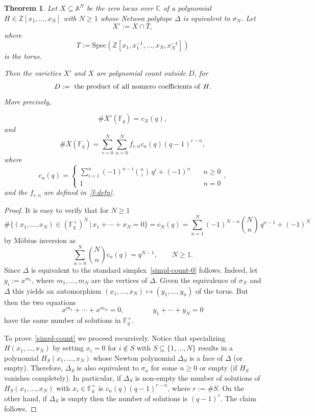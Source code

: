 \documentclass[12pt]{article}
\newcommand{\Spec}{\mbox{Spec}}
\newcommand{\Z}{{\mathbb Z}}
\newcommand{\F}{{\mathbb F}}
\newcommand{\C}{{\mathbb C}}
\newcommand{\A}{\mathbb A}
\newtheorem{theorem}{Theorem}[section]
\begin{document}
\begin{theorem}
\label{simpl-count-thm}
  Let $X\subseteq \A^N$ be the zero locus over $\C$ of a polynomial
  $H\in \Z[x_1,\ldots,x_N]$ with $N\geq 1$ whose Netwon polytope $\Delta$
  is equivalent to $\sigma_N$. Let
$$
X':=X\cap T,
$$
where 
$$
T:=\Spec(\Z[x_1,x_1^{-1},\ldots,x_N,x_N^{-1}])
$$
is the torus. 

Then the varieties $X'$ and  $X$ are polynomial count outside $D$, for
$$D:={\rm\ the \ product\ of \ all\  nonzero\  coefficients\ of\ }H.$$
More
precisely, 

\begin{equation}
\label{simpl-count-0}
\#X'(\F_q)= c_N(q), 
\end{equation}
and
\begin{equation}
\label{simpl-count}
\#X(\F_q)=\sum_{r=0}^N\sum_{n=0}^N
f_{r,n}c_n(q)(q-1)^{r-n},
\end{equation}
where
$$
c_n(q)=
\begin{cases}
\sum_{i=1}^n(-1)^{n-i}\binom{n}{i}\, q^i + (-1)^n&\quad n\geq 0\\
1 & \quad n=0
\end{cases},
$$
 and the $f_{r,n}$ are defined in~\eqref{f-defn}.
\end{theorem}
\begin{proof}
  It is easy to verify that for $N\ge 1$
$$
\#\{(x_1,\ldots,x_N)\in (\F_q^\times)^N \,|\,
x_1+\cdots
+x_N=0\}= c_N(q)=\sum_{n=1}^N(-1)^{N-n}\binom Nn\, q^{n-1} + (-1)^N
$$
by M\"obius inversion as
$$
\sum_{n=0}^N\binom N nc_n(q)=q^{N-1},\qquad N\geq 1.
$$
Since $\Delta$ is equivalent to the standard
simplex~\eqref{simpl-count-0} follows. Indeed, 
let $y_i:=x^{m_i}$, where $m_1,\ldots,m_N$ are
the vertices of $\Delta$. Given the equivalence of $\sigma_N$ and
$\Delta$ this yields an automorphism $(x_1,\ldots,x_N)\mapsto
(y_1,\ldots,y_n)$ of the torus. But then the two equations
$$
x^{m_1}+\cdots+x^{m_N}=0, \qquad \qquad y_1+\cdots+y_N=0
$$
have the same number of solutions in $\F_q^\times$.

To prove~\eqref{simpl-count} we proceed recursively. Notice that
specializing $H(x_1,\ldots,x_N)$ by setting $x_i=0$ for $i\notin S$
with $S\subseteq \{1,\ldots,N\}$ results in a polynomial
$H_S(x_1,\ldots,x_N)$ whose Newton polynomial $\Delta_S$ is a face of
$\Delta$ (or empty). Therefore, $\Delta_S$ is also equivalent to
$\sigma_n$ for some $n\geq 0$ or empty (if $H_S$ vanishes
completely). In particular, if $\Delta_S$ is non-empty the number of
solutions of $H_S(x_1,\ldots,x_N)$ with $x_i\in \F_q^\times$ is
$c_n(q)(q-1)^{r-n}$, where $r:=\#S$. On the other hand, if $\Delta_S$
is empty then the number of solutions is $(q-1)^r$. The claim follows.
\end{proof}
\end{document}
